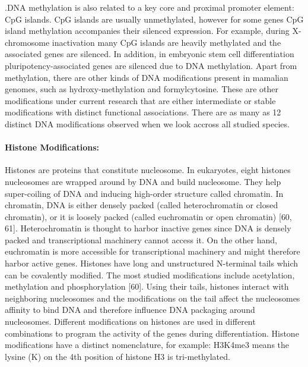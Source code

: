 \documentclass[12pt,]{krantz}
\let\oldparagraph\paragraph
\renewcommand{\paragraph}[1]{\oldparagraph{#1}\mbox{}}
\theoremstyle{definition}
\theoremstyle{definition}
\theoremstyle{definition}
\theoremstyle{remark}
\begin{document}
.DNA methylation is also related to a key core and proximal promoter
element: CpG islands. CpG islands are usually unmethylated, however for
some genes CpG island methylation accompanies their silenced expression.
For example, during X-chromosome inactivation many CpG islands are
heavily methylated and the associated genes are silenced. In addition,
in embryonic stem cell differentiation pluripotency-associated genes are
silenced due to DNA methylation. Apart from methylation, there are other
kinds of DNA modifications present in mamalian genomes, such as
hydroxy-methylation and formylcytosine. These are other modifications
under current research that are either intermediate or stable
modifications with distinct functional associations. There are as many
as 12 distinct DNA modifications observed when we look accross all
studied species.

\hypertarget{histone-modifications}{%
\paragraph{Histone Modifications:}\label{histone-modifications}}

Histones are proteins that constitute nucleosome. In eukaryotes, eight
histones nucleosomes are wrapped around by DNA and build nucleosome.
They help super-coiling of DNA and inducing high-order structure called
chromatin. In chromatin, DNA is either densely packed (called
heterochromatin or closed chromatin), or it is loosely packed (called
euchromatin or open chromatin) {[}60, 61{]}. Heterochromatin is thought
to harbor inactive genes since DNA is densely packed and transcriptional
machinery cannot access it. On the other hand, euchromatin is more
accessible for transcriptional machinery and might therefore harbor
active genes. Histones have long and unstructured N-terminal tails which
can be covalently modified. The most studied modifications include
acetylation, methylation and phosphorylation {[}60{]}. Using their
tails, histones interact with neighboring nucleosomes and the
modifications on the tail affect the nucleosomes affinity to bind DNA
and therefore influence DNA packaging around nucleosomes. Different
modifications on histones are used in different combinations to program
the activity of the genes during differentiation. Histone modifications
have a distinct nomenclature, for example: H3K4me3 means the lysine (K)
on the 4th position of histone H3 is tri-methylated.
\end{document}
